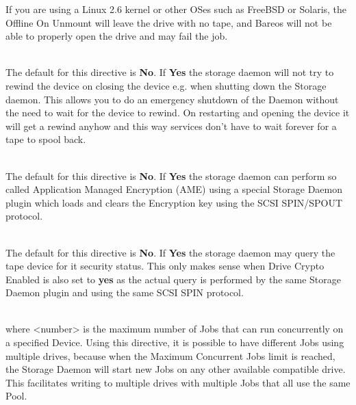 \begin{description}
If you are using a Linux 2.6 kernel or other OSes
such as FreeBSD or Solaris, the Offline On Unmount will leave the drive
with no tape, and Bareos will not be able to properly open the drive and
may fail the job.

\item [No Rewind On Close = {\textless}yes{\textbar}no{\textgreater}] \hfill \\
The default for this directive is {\bf No}. If {\bf Yes} the storage daemon
will not try to rewind the device on closing the device e.g. when shutting
down the Storage daemon. This allows you to do an emergency shutdown of
the Daemon without the need to wait for the device to rewind. On restarting
and opening the device it will get a rewind anyhow and this way services
don't have to wait forever for a tape to spool back.

\item [Drive Crypto Enabled = {\textless}yes{\textbar}no{\textgreater}] \hfill \\
The default for this directive is {\bf No}. If {\bf Yes} the storage daemon
can perform so called Application Managed Encryption (AME) using a special
Storage Daemon plugin which loads and clears the Encryption key using the
SCSI SPIN/SPOUT protocol.

\item [Query Crypto Status = {\textless}yes{\textbar}no{\textgreater}] \hfill \\
The default for this directive is {\bf No}. If {\bf Yes} the storage daemon
may query the tape device for it security status. This only makes sense when
Drive Crypto Enabled is also set to {\bf yes} as the actual query is performed
by the same Storage Daemon plugin and using the same SCSI SPIN protocol.

\item [Maximum Concurrent Jobs = {\textless}number{\textgreater}] \hfill \\
where {\textless}number{\textgreater} is the maximum number of Jobs that can run
concurrently on a specified Device.  Using this directive, it is possible
to have different Jobs using multiple drives, because when
the Maximum Concurrent Jobs limit is
reached, the Storage Daemon will start new Jobs on any other available
compatible drive.  This facilitates writing to multiple drives with
multiple Jobs that all use the same Pool.


\end{description}

